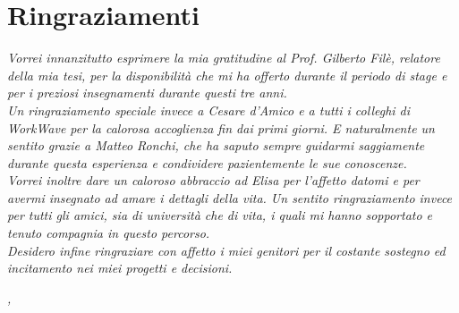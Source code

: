 
\cleardoublepage
{}
{}


\bigskip

\begingroup
\let\clearpage\relax
\let\cleardoublepage\relax
\let\cleardoublepage\relax

\chapter*{Ringraziamenti}

\noindent \textit{Vorrei innanzitutto esprimere la mia gratitudine al Prof. Gilberto Filè, relatore della mia tesi, per la disponibilità che mi ha offerto durante il periodo di stage e per i preziosi insegnamenti durante questi tre anni.}\\

\noindent \textit{Un ringraziamento speciale invece a Cesare d'Amico e a tutti i colleghi di WorkWave per la calorosa accoglienza fin dai primi giorni. E naturalmente un sentito grazie a Matteo Ronchi, che ha saputo sempre guidarmi saggiamente durante questa esperienza e condividere pazientemente le sue conoscenze.}\\

\noindent \textit{Vorrei inoltre dare un caloroso abbraccio ad Elisa per l'affetto datomi e per avermi insegnato ad amare i dettagli della vita. Un sentito ringraziamento invece per tutti gli amici, sia di università che di vita, i quali mi hanno sopportato e tenuto compagnia in questo percorso.}\\

\noindent \textit{Desidero infine ringraziare con affetto i miei genitori per il costante sostegno ed incitamento nei miei progetti e decisioni.}\\

\bigskip

\noindent\textit{\myLocation, \myTime}
\hfill \myName

\endgroup

